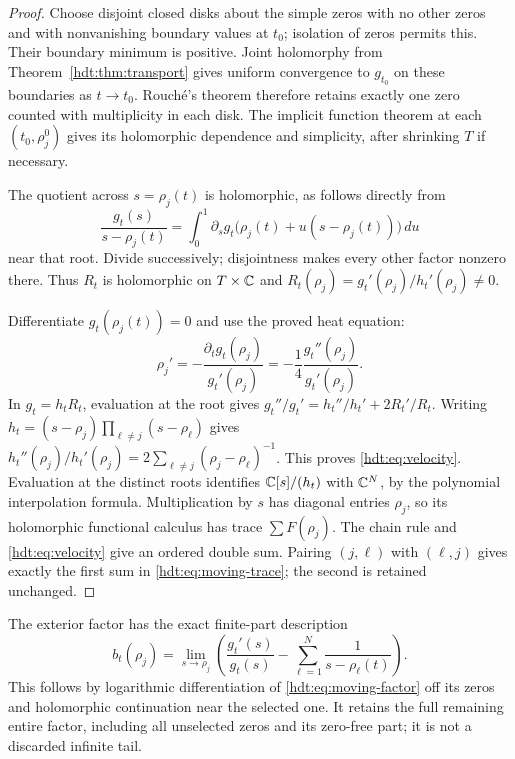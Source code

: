 \begin{proof}
Choose disjoint closed disks about the simple zeros with no other
zeros and with nonvanishing boundary values at $t_0$; isolation
of zeros permits this. Their boundary minimum is positive.
Joint holomorphy from Theorem~\ref{hdt:thm:transport} gives uniform
convergence to $g_{t_0}$ on these boundaries as $t\to t_0$.
Rouch\'e's theorem therefore retains exactly one zero counted with
multiplicity in each disk. The implicit function theorem at each
$(t_0,\rho_j^0)$ gives its holomorphic dependence and simplicity,
after shrinking $T$ if necessary.

The quotient across $s=\rho_j(t)$ is holomorphic, as follows
directly from
\[
\frac{g_t(s)}{s-\rho_j(t)}
=\int_0^1\partial_sg_t\bigl(\rho_j(t)
+u(s-\rho_j(t))\bigr)\,du
\]
near that root. Divide successively; disjointness makes every
other factor nonzero there. Thus $R_t$ is holomorphic on
$T\times\mathbb C$ and
$R_t(\rho_j)=g_t'(\rho_j)/h_t'(\rho_j)\ne0$.

Differentiate $g_t(\rho_j(t))=0$ and use the proved heat equation:
\[
\rho_j'=-\frac{\partial_tg_t(\rho_j)}{g_t'(\rho_j)}
=-\frac14\frac{g_t''(\rho_j)}{g_t'(\rho_j)}.
\]
In $g_t=h_tR_t$, evaluation at the root gives
$g_t''/g_t'=h_t''/h_t'+2R_t'/R_t$.
Writing $h_t=(s-\rho_j)\prod_{\ell\ne j}(s-\rho_\ell)$ gives
$h_t''(\rho_j)/h_t'(\rho_j)
=2\sum_{\ell\ne j}(\rho_j-\rho_\ell)^{-1}$.
This proves \eqref{hdt:eq:velocity}. Evaluation at the distinct roots
identifies $\mathbb C[s]/(h_t)$ with $\mathbb C^N$, by the polynomial
interpolation formula. Multiplication by $s$ has diagonal entries
$\rho_j$, so its holomorphic functional calculus has trace $\sum F(\rho_j)$.
The chain rule and \eqref{hdt:eq:velocity} give an ordered double sum.
Pairing $(j,\ell)$ with $(\ell,j)$ gives exactly the first sum in
\eqref{hdt:eq:moving-trace}; the second is retained unchanged.
\end{proof}

The exterior factor has the exact finite-part description
\begin{equation}\label{hdt:eq:exterior-finite-part}
b_t(\rho_j)=\lim_{s\to\rho_j}
\left(\frac{g_t'(s)}{g_t(s)}-
\sum_{\ell=1}^N\frac1{s-\rho_\ell(t)}\right).
\end{equation}
This follows by logarithmic differentiation of \eqref{hdt:eq:moving-factor}
off its zeros and holomorphic continuation near the selected one.
It retains the full remaining entire factor, including all unselected
zeros and its zero-free part; it is not a discarded infinite tail.

